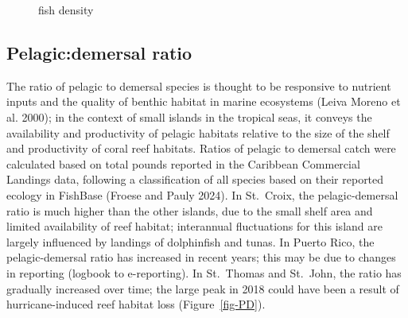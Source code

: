 \documentclass[
  letterpaper,
  oneside,
  open=any]{scrbook}
\begin{document}
\begin{figure}


\caption{\label{fig-fishdensity}fish density}

\end{figure}%

\subsection{Pelagic:demersal ratio}\label{pelagicdemersal-ratio}

The ratio of pelagic to demersal species is thought to be responsive to
nutrient inputs and the quality of benthic habitat in marine ecosystems
(Leiva Moreno et al. 2000); in the context of small islands in the
tropical seas, it conveys the availability and productivity of pelagic
habitats relative to the size of the shelf and productivity of coral
reef habitats. Ratios of pelagic to demersal catch were calculated based
on total pounds reported in the Caribbean Commercial Landings data,
following a classification of all species based on their reported
ecology in FishBase (Froese and Pauly 2024). In St.~Croix, the
pelagic-demersal ratio is much higher than the other islands, due to the
small shelf area and limited availability of reef habitat; interannual
fluctuations for this island are largely influenced by landings of
dolphinfish and tunas. In Puerto Rico, the pelagic-demersal ratio has
increased in recent years; this may be due to changes in reporting
(logbook to e-reporting). In St.~Thomas and St.~John, the ratio has
gradually increased over time; the large peak in 2018 could have been a
result of hurricane-induced reef habitat loss (Figure~\ref{fig-PD}).
\end{document}
